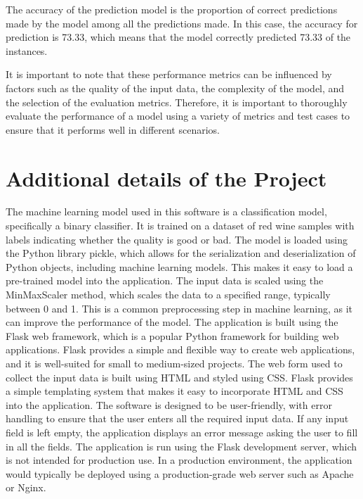\documentclass[a4paper, 12pt]{report}
\begin{document}
The accuracy of the prediction model is the proportion of correct predictions made by the model among all the predictions made. In this case, the accuracy for prediction is 73.33, which means that the model correctly predicted 73.33 of the instances.

It is important to note that these performance metrics can be influenced by factors such as the quality of the input data, the complexity of the model, and the selection of the evaluation metrics. Therefore, it is important to thoroughly evaluate the performance of a model using a variety of metrics and test cases to ensure that it performs well in different scenarios.

\pagebreak
\section{Additional details of the Project}
\par The machine learning model used in this software is a classification model, specifically a binary classifier. It is trained on a dataset of red wine samples with labels indicating whether the quality is good or bad.
The model is loaded using the Python library pickle, which allows for the serialization and deserialization of Python objects, including machine learning models. This makes it easy to load a pre-trained model into the application.
The input data is scaled using the MinMaxScaler method, which scales the data to a specified range, typically between 0 and 1. This is a common preprocessing step in machine learning, as it can improve the performance of the model.
The application is built using the Flask web framework, which is a popular Python framework for building web applications. Flask provides a simple and flexible way to create web applications, and it is well-suited for small to medium-sized projects.
The web form used to collect the input data is built using HTML and styled using CSS. Flask provides a simple templating system that makes it easy to incorporate HTML and CSS into the application.
The software is designed to be user-friendly, with error handling to ensure that the user enters all the required input data. If any input field is left empty, the application displays an error message asking the user to fill in all the fields.
The application is run using the Flask development server, which is not intended for production use. In a production environment, the application would typically be deployed using a production-grade web server such as Apache or Nginx.
\end{document}
